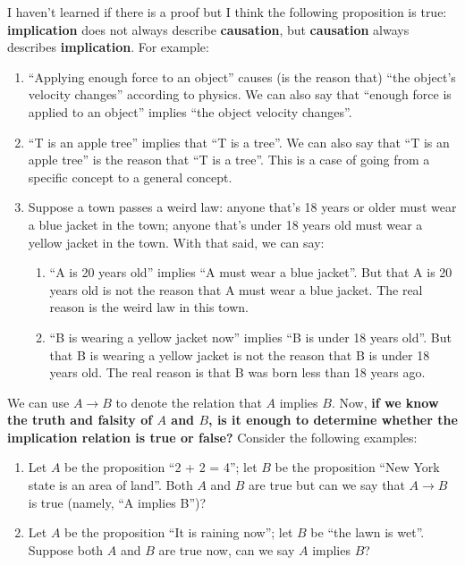 \documentclass[12pt, letterpaper]{article}
\begin{document}
I haven't learned if there is a proof but I think the following proposition is
true: \textbf{implication} does not always describe \textbf{causation}, but
\textbf{causation} always describes \textbf{implication}. For example:
\begin{enumerate}
  \item ``Applying enough force to an object'' causes (is the reason that)
        ``the object's velocity changes'' according to physics. We can also say
        that ``enough force is applied to an object'' implies ``the object velocity
        changes''.
  \item ``T is an apple tree'' implies that ``T is a tree''. We can also say
        that ``T is an apple tree'' is the reason that ``T is a tree''. This is a
        case of going from a specific concept to a general concept.
  \item Suppose a town passes a weird law: anyone that's 18 years or older must
        wear a blue jacket in the town; anyone that's under 18 years old must wear
        a yellow jacket in the town. With that said, we can say:
        \begin{enumerate}
          \item ``A is 20 years old'' implies ``A must wear a blue jacket''. But
                that A is 20 years old is not the reason that A must wear a blue jacket.
                The real reason is the weird law in this town.
          \item ``B is wearing a yellow jacket now'' implies ``B is under 18 years
                old''. But that B is wearing a yellow jacket is not the reason that B
                is under 18 years old. The real reason is that B was born less than 18
                years ago.
        \end{enumerate}
\end{enumerate}

We can use $A \rightarrow B$ to denote the relation that $A$ implies $B$. Now,
\textbf{if we know the truth and falsity of $A$ and $B$, is it enough to
  determine whether the implication relation is true or false?} Consider the
following examples:
\begin{enumerate}
  \item Let $A$ be the proposition ``2 + 2 = 4''; let $B$ be the proposition
        ``New York state is an area of land''. Both $A$ and $B$ are true but can we
        say that $A \rightarrow B$ is true (namely, ``A implies B'')?
  \item Let $A$ be the proposition ``It is raining now''; let $B$ be ``the lawn
        is wet''. Suppose both $A$ and $B$ are true now, can we say $A$ implies $B$?
\end{enumerate}
\end{document}
